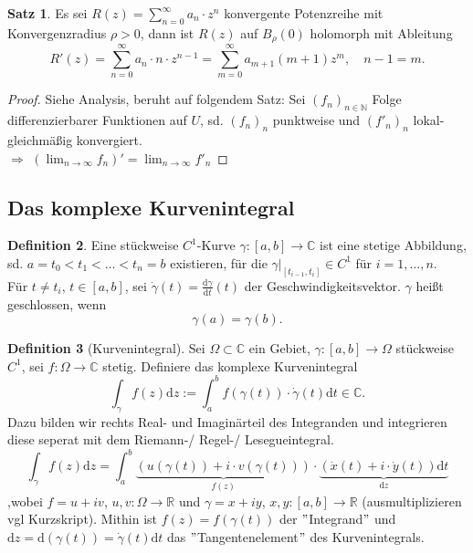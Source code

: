 \documentclass[11pt,titlepage]{article}
\theoremstyle{definition}
\newtheorem{theorem}{Satz}[section]
\newtheorem{definition}[theorem]{Definition}
\theoremstyle{remark}
\begin{document}
	\begin{theorem}
		Es sei $R(z)=\sum_{n=0}^{\infty} a_n \cdot z^n $ konvergente Potenzreihe mit 
		Konvergenzradius $\rho >0$, dann ist $R(z)$ auf $B_{\rho}(0)$ holomorph mit Ableitung 
		\[R'(z)=\sum_{n=0}^{\infty} a_n \cdot n\cdot z^{n-1} =\sum_{m=0}^{\infty}a_{m+1}(m+1)z^m,\quad
		n-1=m.\]
	\end{theorem}
	
	\begin{proof}
		Siehe Analysis, beruht auf folgendem Satz: Sei $(f_n)_{n\in\mathbb{N}}$ Folge differenzierbarer 
		Funktionen auf $U$, sd. $(f_n)_n$ punktweise und $(f'_n)_n$ lokal-gleichmäßig konvergiert. \\
		$\Rightarrow$ $(\lim_{n\to\infty} f_n)'=\lim_{n\to\infty}f'_n$
	\end{proof}
	
	\subsection{Das komplexe Kurvenintegral}
	
	\begin{definition}
		Eine stückweise $C^1$-Kurve $\gamma:[a,b]\to\mathbb{C}$ ist eine stetige Abbildung, sd. 
		$a=t_0 < t_1 <\ldots<t_n=b$ existieren, für die $\gamma |_{ [t_{i-1},t_i]}\in C^1$ für 
		$i=1,\ldots ,n$. \\
		Für $t\neq t_i$, $t\in [a,b]$, sei $\dot{\gamma}(t)=\frac{\mathrm{d}\gamma}{\mathrm{d}t}(t)$ der 
		Geschwindigkeitsvektor. $\gamma$ heißt geschlossen, wenn \[\gamma(a)=\gamma(b).\]
	\end{definition}
	
	\begin{definition}[Kurvenintegral]
		Sei $\Omega\subset\mathbb{C}$ ein Gebiet, $\gamma:[a,b]\to\Omega$ stückweise $C^1$, sei 
		$f:\Omega\to\mathbb{C}$ stetig. Definiere das komplexe Kurvenintegral
		\[ \int_{\gamma} f(z)\mathrm{d}z :=\int_a^b f(\gamma(t))\cdot \dot{\gamma}(t) 
		\mathrm{d}t \in \mathbb{C}. \]
		Dazu bilden wir rechts Real- und Imaginärteil des Integranden und 
		integrieren diese seperat mit dem Riemann-/ Regel-/ Lesegueintegral.
		\[ \int_{\gamma} f(z)\mathrm{d}z =\int_a^b \underbrace{(u(\gamma(t))+i\cdot v(\gamma(t)))}_{f(z)}
		\cdot \underbrace{(\dot{x}(t)+i\cdot \dot{y}(t))\mathrm{d}t}_{\mathrm{d}z} \]
		,wobei $f=u+iv$, $u,v:\Omega\to\mathbb{R}$ und $\gamma =x+iy$, $x,y:[a,b]\to\mathbb{R}$ 
		(ausmultiplizieren vgl Kurzskript).  Mithin ist $f(z)=f(\gamma(t))$ der $"$Integrand$"$ und 
		$\mathrm{d}z=\mathrm{d}(\gamma(t))=\dot{\gamma}(t)\mathrm{d}t$ das 
		$"$Tangentenelement$"$ des Kurvenintegrals.
	\end{definition}
	
\end{document}
